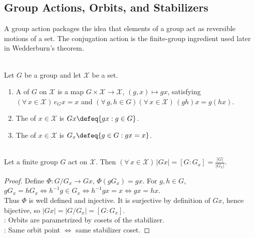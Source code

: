 \subsection{Group Actions, Orbits, and Stabilizers}


A group action packages the idea that elements of a group act as reversible motions of a set. The conjugation action is the finite-group ingredient used later in Wedderburn's theorem.

\begin{definition} \label{def:group-action-orbit-stabilizer} \\
Let $G$ be a group and let $\mathcal{X}$ be a set.
\begin{enumerate}[label=(\roman*)]
\setlength{\itemsep}{0pt}
\item A  of $G$ on $\mathcal{X}$ is a map $G\times\mathcal{X}\to\mathcal{X}$, $(g,x)\mapsto gx$, satisfying $(\forall\,x\in\mathcal{X})\,e_Gx=x$ and $(\forall\,g,h\in G)(\forall\,x\in\mathcal{X})\,(gh)x=g(hx)$.
\item The  of $x\in\mathcal{X}$ is $Gx\defeq\{gx:g\in G\}$.
\item The  of $x\in\mathcal{X}$ is $G_x\defeq\{g\in G:gx=x\}$.
\end{enumerate}
\end{definition}

\begin{theorem} \label{thm:orbit-stabilizer-finite-group-actions} \\
Let a finite group $G$ act on $\mathcal{X}$. Then $(\forall\,x\in\mathcal{X})\,|Gx|=[G:G_x]=\frac{|G|}{|G_x|}$.
\begin{proof}
Define $\Phi:G/G_x\to Gx$, $\Phi(gG_x)=gx$. For $g,h\in G$, $gG_x=hG_x \iff h^{-1}g\in G_x \iff h^{-1}gx=x \iff gx=hx$.\\
Thus $\Phi$ is well defined and injective. It is surjective by definition of $Gx$, hence bijective, so $|Gx|=|G/G_x|=[G:G_x]$.\\
: Orbits are parametrized by cosets of the stabilizer.\\
: Same orbit point $\iff$ same stabilizer coset.
\end{proof}
\end{theorem}
